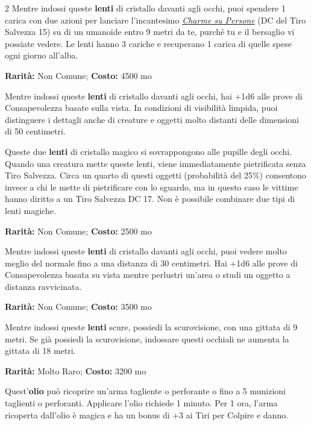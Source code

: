 \begin{multicols}{2}
Mentre indossi queste \textbf{lenti} di cristallo davanti agli occhi, puoi spendere 1 carica con due azioni per lanciare l'incantesimo \emph{\hyperlink{Charme su Persone}{Charme su Persone}} (DC del Tiro Salvezza 15) su di un umanoide entro 9 metri da te, purché tu e il bersaglio vi possiate vedere. Le lenti hanno 3 cariche e recuperano 1 carica di quelle spese ogni giorno all'alba.


\textbf{Rarità:} Non Comune; \textbf{Costo:} 4500 mo

Mentre indossi queste \textbf{lenti} di cristallo davanti agli occhi, hai +1d6 alle prove di Consapevolezza basate sulla vista. In condizioni di visibilità limpida, puoi distinguere i dettagli anche di creature e oggetti molto distanti delle dimensioni di 50 centimetri.


Queste due \textbf{lenti} di cristallo magico si sovrappongono alle pupille degli occhi. Quando una creatura mette queste lenti, viene immediatamente pietrificata senza Tiro Salvezza. Circa un quarto di questi oggetti (probabilità del 25\%) consentono invece a chi le mette di pietrificare con lo sguardo, ma in questo caso le vittime hanno diritto a un Tiro Salvezza DC 17. Non è possibile combinare due tipi di lenti magiche.


\textbf{Rarità:} Non Comune; \textbf{Costo:} 2500 mo

Mentre indossi queste \textbf{lenti} di cristallo davanti agli occhi, puoi vedere molto meglio del normale fino a una distanza di 30 centimetri. Hai +1d6 alle prove di Consapevolezza basata su vista mentre perlustri un'area o studi un oggetto a distanza ravvicinata.


\textbf{Rarità:} Non Comune; \textbf{Costo:} 3500 mo

Mentre indossi queste \textbf{lenti} scure, possiedi la scurovisione, con una gittata di 9 metri. Se già possiedi la scurovisione, indossare questi occhiali ne aumenta la gittata di 18 metri.


\textbf{Rarità:} Molto Raro; \textbf{Costo:} 3200 mo

Quest'\textbf{olio} può ricoprire un'arma tagliente o perforante o fino a 5 munizioni taglienti o perforanti. Applicare l'olio richiede 1 minuto. Per 1 ora, l'arma ricoperta dall'olio è magica e ha un bonus di +3 ai Tiri per Colpire e danno.


\end{multicols}
